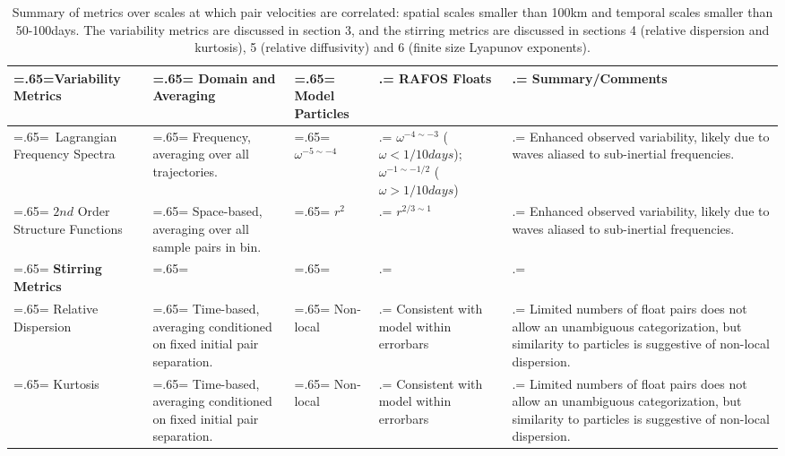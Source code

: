 \documentclass[]{ametsoc}
\begin{document}
\begin{table}[t]
%
\small{
\caption{Summary of metrics over scales at which pair velocities are correlated: spatial scales smaller than 100km and temporal scales smaller than 50-100days. The variability metrics are discussed in section 3, and the stirring metrics are discussed in sections 4 (relative dispersion and kurtosis), 5 (relative diffusivity) and  6 (finite size Lyapunov exponents).}}\label{t2}

\begin{center}
    \small{
    \begin{tabularx}{1.\textwidth}{
    |>{\hsize=.65\hsize\linewidth=\hsize}X|
     >{\hsize=.65\hsize\linewidth=\hsize}X|
     >{\hsize=.65\hsize\linewidth=\hsize}X|
     >{\hsize=1.\hsize\linewidth=\hsize}X|
     >{\hsize=1.\hsize\linewidth=\hsize}X|}
    \hline\hline
        \textbf{Variability Metrics} & Domain and Averaging & Model Particles & RAFOS Floats & Summary/Comments \\
    \hline\
        Lagrangian Frequency Spectra & Frequency, averaging over all trajectories. & $\omega^{-5 \sim -4}$ & $\omega^{-4 \sim -3}$ ($\omega<1/10days$); $\omega^{-1 \sim -1/2}$ ($\omega>1/10days$) & Enhanced observed variability, likely due to waves aliased to sub-inertial frequencies. \\
    \hline
        $2nd$ Order Structure Functions & Space-based, averaging over all sample pairs in bin. & $r^2$ & $r^{2/3 \sim 1}$ & Enhanced observed variability, likely due to waves aliased to sub-inertial frequencies.  \\ 
    \hline \hline
        \textbf{Stirring Metrics} & & & &  \\
    \hline 
        Relative Dispersion & Time-based, averaging conditioned on fixed initial pair separation. & Non-local & Consistent with model within errorbars & Limited numbers of float pairs does not allow an unambiguous categorization, but similarity to particles is suggestive of non-local dispersion. \\
    \hline
        Kurtosis & Time-based, averaging conditioned on fixed initial pair separation. & Non-local & Consistent with model within errorbars &  Limited numbers of float pairs does not allow an unambiguous categorization, but similarity to particles is suggestive of non-local dispersion. \\

\end{tabularx}}
\end{center}
\end{table}
\end{document}
